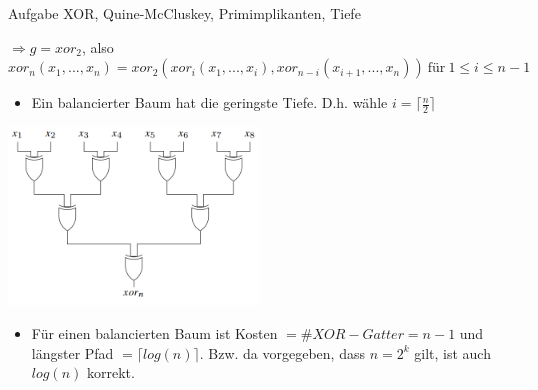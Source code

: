\begin{frame}[allowframebreaks]{Aufgabe \thesection}{XOR, Quine-McCluskey, Primimplikanten, Tiefe}
\begin{solution}
\begin{itemize}
\begin{table}
        \end{table}
        $\Rightarrow g = xor_2$, also $x o r_{n}\left(x_{1},...,x_{n}\right)=x o r_{2}\left(x o r_{i}\left(x_{1},...,x_{i}\right),x o r_{n-i}\left(x_{i+1},...,x_{n}\right)\right){\mathrm{~für~1}}\leq i\leq n-1$
    \end{itemize}
  \end{solution}
  \begin{solution}
    \begin{itemize}
      \item Ein balancierter Baum hat die geringste Tiefe. D.h. wähle $i = \lceil \frac{n}{2}\rceil$
    \end{itemize}
    \includegraphics[width=0.5\textwidth, center]{./figures/tree.png}
  \end{solution}
  \begin{solution}
    \begin{itemize}
      \item Für einen balancierten Baum ist Kosten $= \#XOR{-}Gatter = n - 1$ und längster Pfad $= \lceil log(n)\rceil$. Bzw. da vorgegeben, dass $n = 2^k$ gilt, ist auch $log(n)$ korrekt.
    \end{itemize}
  \end{solution}
\end{frame}
